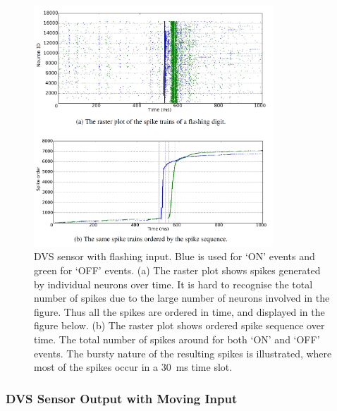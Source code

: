 \begin{figure}[tbh!]
	\centering
	\includegraphics[width=0.8\textwidth]{pics_bench/fig5.jpg}	
	\caption{DVS sensor with flashing input.
		Blue is used for `ON' events and green for `OFF' events.
		(a) The raster plot shows spikes generated by individual neurons over time.
		It is hard to recognise the total number of spikes due to the large number of neurons involved in the figure.
		Thus all the spikes are ordered in time, and displayed in the figure below.
		(b) The raster plot shows \DIFaddbeginFL {}\DIFaddendFL ordered spike sequence over time.
		The total number of spikes \DIFdelbeginFL {}\DIFdelendFL \DIFaddbeginFL {}\DIFaddendFL around \DIFdelbeginFL {}\DIFdelendFL \DIFaddbeginFL {}\DIFaddendFL for both `ON' and `OFF' events.
		The bursty nature of the resulting spikes is illustrated, where most of the spikes occur in a 30~ms time slot.}
	\label{fig:flash}
\end{figure}

\subsubsection{DVS Sensor Output with Moving Input}


